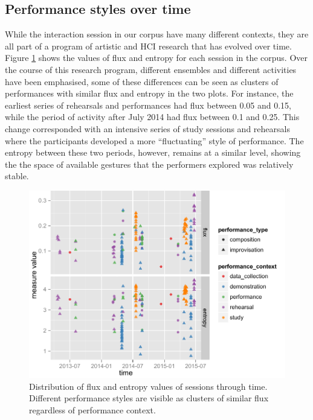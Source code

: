 \documentclass{sigchi}
\begin{document}

\subsection{Performance styles over time}

While the interaction session in our corpus have many different
contexts, they are all part of a program of artistic and HCI research
that has evolved over time. Figure \ref{fig:flux-entropy-through-time}
shows the values of flux and entropy for each session in the corpus.
Over the course of this research program, different ensembles and
different activities have been emphasised, some of these differences
can be seen as clusters of performances with similar flux and entropy
in the two plots. For instance, the earliest series of rehearsals and
performances had flux between 0.05 and 0.15, while the period of
activity after July 2014 had flux between 0.1 and 0.25. This change
corresponded with an intensive series of study sessions and rehearsals
where the participants developed a more ``fluctuating'' style of
performance. The entropy between these two periods, however, remains
at a similar level, showing the the space of available gestures that
the performers explored was relatively stable.

\begin{figure}
  \centering
  \includegraphics[width=\linewidth]{figures/flux-entropy-through-time}
  \caption{Distribution of flux and entropy values of sessions through time.
    Different performance styles are visible as clusters of similar
    flux regardless of performance context.
    \label{fig:flux-entropy-through-time}}
\end{figure}
\end{document}
